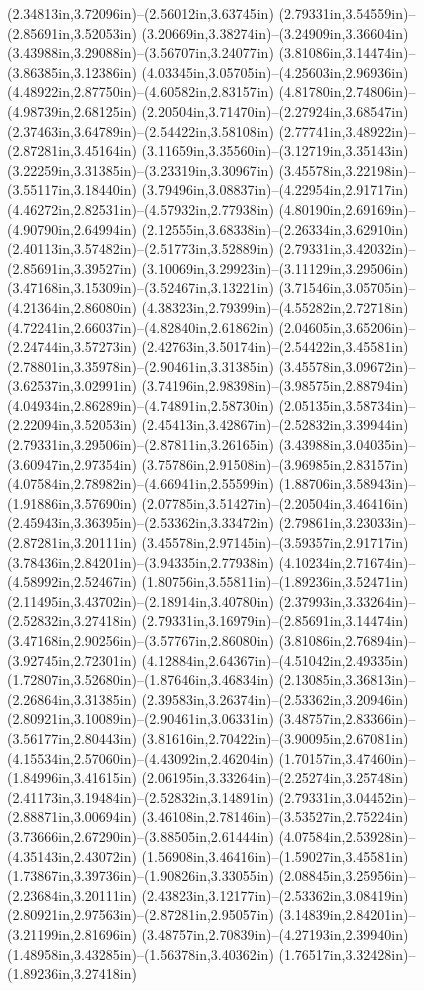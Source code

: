 (2.34813in,3.72096in)--(2.56012in,3.63745in) (2.79331in,3.54559in)--(2.85691in,3.52053in) (3.20669in,3.38274in)--(3.24909in,3.36604in) (3.43988in,3.29088in)--(3.56707in,3.24077in) (3.81086in,3.14474in)--(3.86385in,3.12386in) (4.03345in,3.05705in)--(4.25603in,2.96936in) (4.48922in,2.87750in)--(4.60582in,2.83157in) (4.81780in,2.74806in)--(4.98739in,2.68125in) (2.20504in,3.71470in)--(2.27924in,3.68547in) (2.37463in,3.64789in)--(2.54422in,3.58108in) (2.77741in,3.48922in)--(2.87281in,3.45164in) (3.11659in,3.35560in)--(3.12719in,3.35143in) (3.22259in,3.31385in)--(3.23319in,3.30967in) (3.45578in,3.22198in)--(3.55117in,3.18440in) (3.79496in,3.08837in)--(4.22954in,2.91717in) (4.46272in,2.82531in)--(4.57932in,2.77938in) (4.80190in,2.69169in)--(4.90790in,2.64994in) (2.12555in,3.68338in)--(2.26334in,3.62910in) (2.40113in,3.57482in)--(2.51773in,3.52889in) (2.79331in,3.42032in)--(2.85691in,3.39527in) (3.10069in,3.29923in)--(3.11129in,3.29506in) (3.47168in,3.15309in)--(3.52467in,3.13221in) (3.71546in,3.05705in)--(4.21364in,2.86080in) (4.38323in,2.79399in)--(4.55282in,2.72718in) (4.72241in,2.66037in)--(4.82840in,2.61862in) (2.04605in,3.65206in)--(2.24744in,3.57273in) (2.42763in,3.50174in)--(2.54422in,3.45581in) (2.78801in,3.35978in)--(2.90461in,3.31385in) (3.45578in,3.09672in)--(3.62537in,3.02991in) (3.74196in,2.98398in)--(3.98575in,2.88794in) (4.04934in,2.86289in)--(4.74891in,2.58730in) (2.05135in,3.58734in)--(2.22094in,3.52053in) (2.45413in,3.42867in)--(2.52832in,3.39944in) (2.79331in,3.29506in)--(2.87811in,3.26165in) (3.43988in,3.04035in)--(3.60947in,2.97354in) (3.75786in,2.91508in)--(3.96985in,2.83157in) (4.07584in,2.78982in)--(4.66941in,2.55599in) (1.88706in,3.58943in)--(1.91886in,3.57690in) (2.07785in,3.51427in)--(2.20504in,3.46416in) (2.45943in,3.36395in)--(2.53362in,3.33472in) (2.79861in,3.23033in)--(2.87281in,3.20111in) (3.45578in,2.97145in)--(3.59357in,2.91717in) (3.78436in,2.84201in)--(3.94335in,2.77938in) (4.10234in,2.71674in)--(4.58992in,2.52467in) (1.80756in,3.55811in)--(1.89236in,3.52471in) (2.11495in,3.43702in)--(2.18914in,3.40780in) (2.37993in,3.33264in)--(2.52832in,3.27418in) (2.79331in,3.16979in)--(2.85691in,3.14474in) (3.47168in,2.90256in)--(3.57767in,2.86080in) (3.81086in,2.76894in)--(3.92745in,2.72301in) (4.12884in,2.64367in)--(4.51042in,2.49335in) (1.72807in,3.52680in)--(1.87646in,3.46834in) (2.13085in,3.36813in)--(2.26864in,3.31385in) (2.39583in,3.26374in)--(2.53362in,3.20946in) (2.80921in,3.10089in)--(2.90461in,3.06331in) (3.48757in,2.83366in)--(3.56177in,2.80443in) (3.81616in,2.70422in)--(3.90095in,2.67081in) (4.15534in,2.57060in)--(4.43092in,2.46204in) (1.70157in,3.47460in)--(1.84996in,3.41615in) (2.06195in,3.33264in)--(2.25274in,3.25748in) (2.41173in,3.19484in)--(2.52832in,3.14891in) (2.79331in,3.04452in)--(2.88871in,3.00694in) (3.46108in,2.78146in)--(3.53527in,2.75224in) (3.73666in,2.67290in)--(3.88505in,2.61444in) (4.07584in,2.53928in)--(4.35143in,2.43072in) (1.56908in,3.46416in)--(1.59027in,3.45581in) (1.73867in,3.39736in)--(1.90826in,3.33055in) (2.08845in,3.25956in)--(2.23684in,3.20111in) (2.43823in,3.12177in)--(2.53362in,3.08419in) (2.80921in,2.97563in)--(2.87281in,2.95057in) (3.14839in,2.84201in)--(3.21199in,2.81696in) (3.48757in,2.70839in)--(4.27193in,2.39940in) (1.48958in,3.43285in)--(1.56378in,3.40362in) (1.76517in,3.32428in)--(1.89236in,3.27418in) 